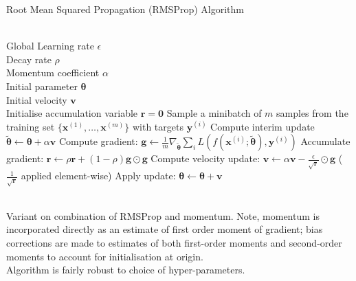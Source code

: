 \begin{breakablealgorithm}
\caption{Root Mean Squared Propagation (RMSProp) Algorithm}
\begin{algorithmic}
\Require \\
Global Learning rate $\epsilon$\\
Decay rate $\rho$\\
Momentum coefficient $\alpha$\\
Initial parameter $\bm{\theta}$\\
Initial velocity $\bm{v}$\\

\State Initialise accumulation variable $\bm{r} = \bm{0}$
\State Sample a minibatch of $m$ samples from the training set $\{\bm{x}^{(1)}, \ldots, \bm{x}^{(m)} \}$ with targets $\bm{y}^{(i)}$
\State Compute interim update $\tilde{\bm{\theta}} \leftarrow \bm{\theta} + \alpha \bm{v}$
\State Compute gradient: $\bm{g} \leftarrow \frac{1}{m} \nabla_{\tilde{\bm{\theta}}} \sum_i L(f(\bm{x}^{(i)}; \tilde{\bm{\theta}}), \bm{y}^{(i)})$
\State Accumulate gradient: $\bm{r} \leftarrow \rho \bm{r} + (1 - \rho) \bm{g} \odot \bm{g}$
\State Compute velocity update: $\bm{v} \leftarrow \alpha \bm{v} - \frac{\epsilon}{\sqrt{\bm{r}}} \odot \bm{g}$ ($\frac{1}{\sqrt{\bm{r}}}$ applied element-wise)
\State Apply update: $\bm{\theta} \leftarrow \bm{\theta} + \bm{v}$
\EndWhile
\end{algorithmic}
\end{breakablealgorithm}

\begin{remark} \\
Variant on combination of RMSProp and momentum. Note, momentum is incorporated directly as an estimate of first order moment of gradient; bias corrections are made to estimates of both first-order moments and second-order moments to account for initialisation at origin.\\
Algorithm is fairly robust to choice of hyper-parameters.
\end{remark}

